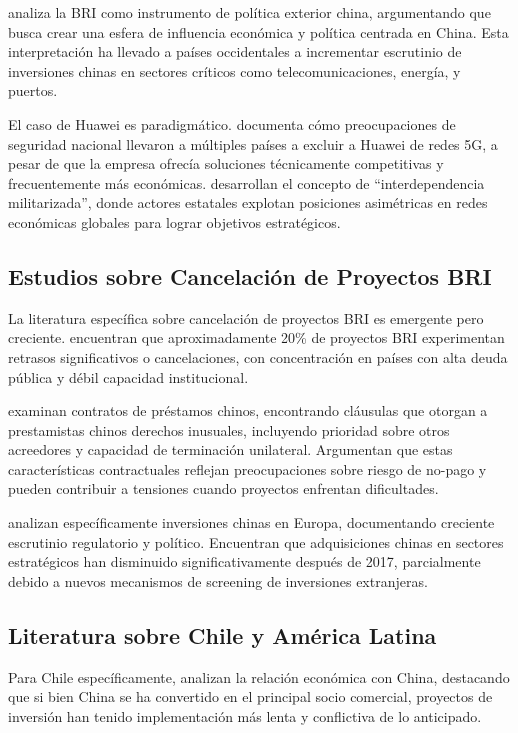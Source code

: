 \documentclass[12pt]{article}
\begin{document}
\citet{maçães2018belt} analiza la BRI como instrumento de política exterior china, argumentando que busca crear una esfera de influencia económica y política centrada en China. Esta interpretación ha llevado a países occidentales a incrementar escrutinio de inversiones chinas en sectores críticos como telecomunicaciones, energía, y puertos.

El caso de Huawei es paradigmático. \citet{sacks2021economic} documenta cómo preocupaciones de seguridad nacional llevaron a múltiples países a excluir a Huawei de redes 5G, a pesar de que la empresa ofrecía soluciones técnicamente competitivas y frecuentemente más económicas. \citet{farrell2019weaponized} desarrollan el concepto de ``interdependencia militarizada'', donde actores estatales explotan posiciones asimétricas en redes económicas globales para lograr objetivos estratégicos.

\subsection{Estudios sobre Cancelación de Proyectos BRI}

La literatura específica sobre cancelación de proyectos BRI es emergente pero creciente. \citet{malik2021banking} encuentran que aproximadamente 20\% de proyectos BRI experimentan retrasos significativos o cancelaciones, con concentración en países con alta deuda pública y débil capacidad institucional.

\citet{gelpern2021china} examinan contratos de préstamos chinos, encontrando cláusulas que otorgan a prestamistas chinos derechos inusuales, incluyendo prioridad sobre otros acreedores y capacidad de terminación unilateral. Argumentan que estas características contractuales reflejan preocupaciones sobre riesgo de no-pago y pueden contribuir a tensiones cuando proyectos enfrentan dificultades.

\citet{kratz2019brussels} analizan específicamente inversiones chinas en Europa, documentando creciente escrutinio regulatorio y político. Encuentran que adquisiciones chinas en sectores estratégicos han disminuido significativamente después de 2017, parcialmente debido a nuevos mecanismos de screening de inversiones extranjeras.

\subsection{Literatura sobre Chile y América Latina}

Para Chile específicamente, \citet{wilhelmy2015chile} analizan la relación económica con China, destacando que si bien China se ha convertido en el principal socio comercial, proyectos de inversión han tenido implementación más lenta y conflictiva de lo anticipado. 
\end{document}
